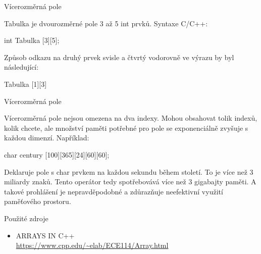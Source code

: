 \documentclass{beamer}
\begin{document}
\begin{frame}{Vícerozměrná pole}
   \begin{flushleft}
        Tabulka je dvourozměrné pole 3 až 5 int prvků. Syntaxe C/C++:
         \begin{center}
            int Tabulka [3][5];
         \end{center}
        Způsob odkazu na druhý prvek svisle a čtvrtý vodorovně ve výrazu by byl následující:
        \begin{center}
            Tabulka [1][3]
        \end{center}
    \end{flushleft}
\end{frame}

\begin{frame}{Vícerozměrná pole}
    \begin{flushleft}
        Vícerozměrná pole nejsou omezena na dva indexy.
        Mohou obsahovat tolik indexů, kolik chcete, ale množství paměti potřebné pro pole se exponenciálně zvyšuje s každou dimenzí. Například:
        \begin{center}
           char century [100][365][24][60][60];
        \end{center}
        Deklaruje pole s char prvkem na každou sekundu během století. To je více než 3 miliardy znaků. Tento operátor tedy spotřebovává více než 3 gigabajty paměti. A takové prohlášení je nepravděpodobné a zdůrazňuje neefektivní využití paměťového prostoru.
    \end{flushleft}
\end{frame}

\begin{frame}{Použité zdroje}
\begin{itemize}
\setlength{\parskip}{0.10em}
    \item ARRAYS IN C++ \\[0.2em]
    \small{\url{https://www.cpp.edu/~elab/ECE114/Array.html}}
\end{itemize}
\end{frame}
\end{document}
